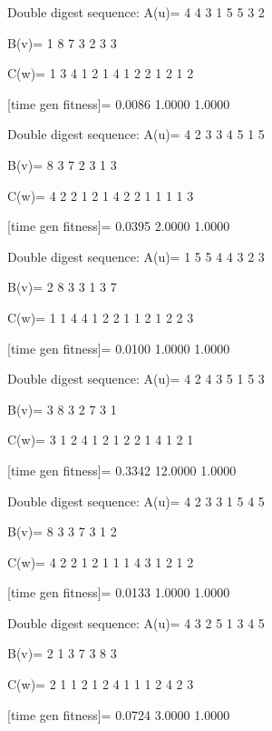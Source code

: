 Double digest sequence:
A(u)=
     4     4     3     1     5     5     3     2

B(v)=
     1     8     7     3     2     3     3

C(w)=
     1     3     4     1     2     1     4     1     2     2     1     2     1     2

[time gen fitness]=
    0.0086    1.0000    1.0000

Double digest sequence:
A(u)=
     4     2     3     3     4     5     1     5

B(v)=
     8     3     7     2     3     1     3

C(w)=
     4     2     2     1     2     1     4     2     2     1     1     1     1     3

[time gen fitness]=
    0.0395    2.0000    1.0000

Double digest sequence:
A(u)=
     1     5     5     4     4     3     2     3

B(v)=
     2     8     3     3     1     3     7

C(w)=
     1     1     4     4     1     2     2     1     1     2     1     2     2     3

[time gen fitness]=
    0.0100    1.0000    1.0000

Double digest sequence:
A(u)=
     4     2     4     3     5     1     5     3

B(v)=
     3     8     3     2     7     3     1

C(w)=
     3     1     2     4     1     2     1     2     2     1     4     1     2     1

[time gen fitness]=
    0.3342   12.0000    1.0000

Double digest sequence:
A(u)=
     4     2     3     3     1     5     4     5

B(v)=
     8     3     3     7     3     1     2

C(w)=
     4     2     2     1     2     1     1     1     4     3     1     2     1     2

[time gen fitness]=
    0.0133    1.0000    1.0000

Double digest sequence:
A(u)=
     4     3     2     5     1     3     4     5

B(v)=
     2     1     3     7     3     8     3

C(w)=
     2     1     1     2     1     2     4     1     1     1     2     4     2     3

[time gen fitness]=
    0.0724    3.0000    1.0000

